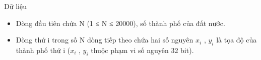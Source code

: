Dữ liệu
\begin{itemize}
	\item Dòng đầu tiên chứa N (1 ≤ N ≤ 20000), số thành phố của đất nước.
	\item Dòng thứ i trong số N dòng tiếp theo chứa hai số nguyên $x_{i}$ , $y_{i}$ là tọa độ của thành phố thứ i ($x_{i}$ , $y_{i}$ thuộc phạm vi số nguyên 32 bit).
\end{itemize}